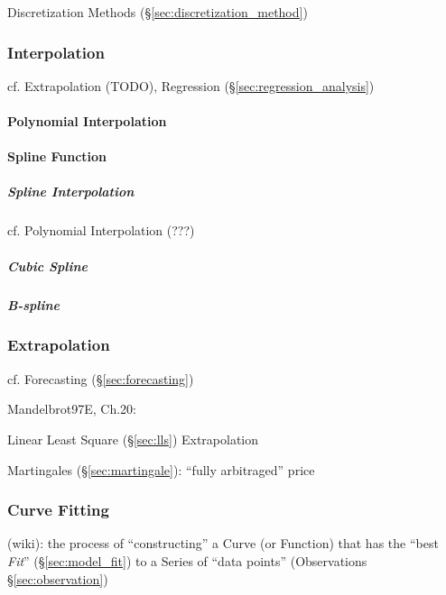 {Discretization Methods (\S\ref{sec:discretization_method})



\subsubsection{Interpolation}\label{sec:interpolation}

cf. Extrapolation (TODO), Regression (\S\ref{sec:regression_analysis})



\paragraph{Polynomial Interpolation}\label{sec:polynomial_interpolation}\hfill

\paragraph{Spline Function}\label{sec:spline}\hfill

\subparagraph{Spline Interpolation}\label{sec:spline_interpolation}\hfill

cf. Polynomial Interpolation (???) %



\subparagraph{Cubic Spline}\label{sec:cubic_spline}\hfill

\subparagraph{B-spline}\label{sec:b_spline}\hfill



\subsubsection{Extrapolation}\label{sec:extrapolation}

cf. Forecasting (\S\ref{sec:forecasting})

Mandelbrot97E, Ch.20:

Linear Least Square (\S\ref{sec:lls}) Extrapolation

Martingales (\S\ref{sec:martingale}): ``fully arbitraged'' price



\subsubsection{Curve Fitting}\label{sec:curve_fitting}

(wiki): the process of ``constructing'' a Curve (or Function) that has the
``best \emph{Fit}'' (\S\ref{sec:model_fit}) to a Series of ``data points''
(Observations \S\ref{sec:observation})

}

